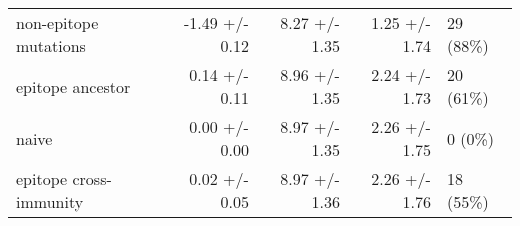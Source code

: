 \begin{tabular*}{1.0\textwidth}{lrrrl}
             non-epitope mutations &  -1.49 +/- 0.12 &                          8.27 +/- 1.35 &                                   1.25 +/- 1.74 &                               29 (88\%) \\
                  epitope ancestor &   0.14 +/- 0.11 &                          8.96 +/- 1.35 &                                   2.24 +/- 1.73 &                               20 (61\%) \\
                             naive &   0.00 +/- 0.00 &                          8.97 +/- 1.35 &                                   2.26 +/- 1.75 &                                 0 (0\%) \\
            epitope cross-immunity &   0.02 +/- 0.05 &                          8.97 +/- 1.36 &                                   2.26 +/- 1.76 &                               18 (55\%) \\
\bottomrule
\end{tabular*}
